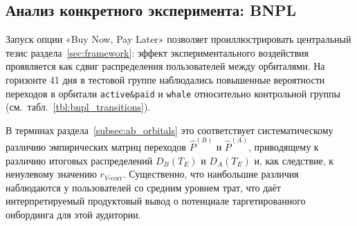 \subsection{Анализ конкретного эксперимента: BNPL}
\label{subsec:bnpl_case}

Запуск опции «Buy Now, Pay Later» позволяет проиллюстрировать
центральный тезис раздела~\ref{sec:framework}: эффект
экспериментального воздействия проявляется как сдвиг распределения
пользователей между орбиталями. На горизонте 41 дня в тестовой
группе наблюдались повышенные вероятности переходов в орбитали
\texttt{active\&paid} и \texttt{whale} относительно контрольной группы
(см.~табл.~\ref{tbl:bnpl_transitions}).

В терминах раздела~\ref{subsec:ab_orbitals} это соответствует
систематическому различию эмпирических матриц переходов
$\widehat{P}^{(B)}$ и $\widehat{P}^{(A)}$, приводящему к различию
итоговых распределений $D_B(T_E)$ и $D_A(T_E)$ и, как следствие, к
ненулевому значению $r_{V\text{-corr}}$. Существенно, что наибольшие
различия наблюдаются у пользователей со средним уровнем трат, что
даёт интерпретируемый продуктовый вывод о потенциале таргетированного
онбординга для этой аудитории.

